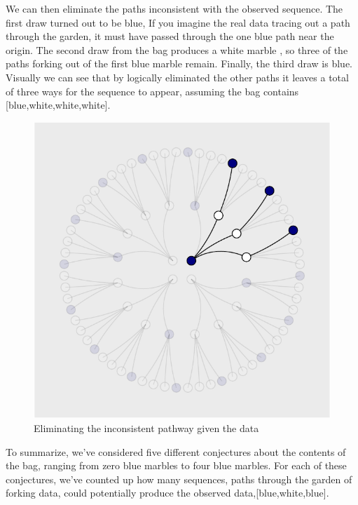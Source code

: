 \documentclass{article}
\begin{document}
We can then eliminate the paths inconsistent with the observed sequence.
The first draw turned out to be blue, If you imagine the real data
tracing out a path through the garden, it must have passed through the
one blue path near the origin. The second draw from the bag produces a
white marble , so three of the paths forking out of the first blue
marble remain. Finally, the third draw is blue. Visually we can see that
by logically eliminated the other paths it leaves a total of three ways
for the sequence to appear, assuming the bag contains
{[}blue,white,white,white{]}.

\begin{figure}

{\centering \includegraphics{qrap_paper_files/figure-latex/unnamed-chunk-1-1} 

}

\caption{Eliminating the inconsistent pathway given the data}\label{fig:unnamed-chunk-1}
\end{figure}

To summarize, we've considered five different conjectures about the
contents of the bag, ranging from zero blue marbles to four blue
marbles. For each of these conjectures, we've counted up how many
sequences, paths through the garden of forking data, could potentially
produce the observed data,{[}blue,white,blue{]}.
\end{document}
